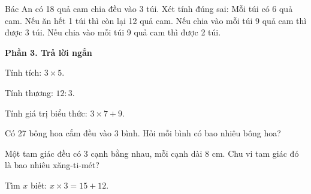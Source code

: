 \begin{ex} %
Bác An có 18 quả cam chia đều vào 3 túi. Xét tính đúng sai:
\choiceTF
{\True Mỗi túi có 6 quả cam.}
{\True Nếu ăn hết 1 túi thì còn lại 12 quả cam.}
{Nếu chia vào mỗi túi 9 quả cam thì được 3 túi.}
{\True Nếu chia vào mỗi túi 9 quả cam thì được 2 túi.}
\end{ex}

\textbf{Phần 3. Trả lời ngắn}

\begin{ex} %
Tính tích: $3 \times 5$.
\end{ex}

\begin{ex} %
Tính thương: $12 : 3$.
\end{ex}

\begin{ex} %
Tính giá trị biểu thức: $3 \times 7 + 9$.
\end{ex}

\begin{ex} %
Có 27 bông hoa cắm đều vào 3 bình. Hỏi mỗi bình có bao nhiêu bông hoa?
\end{ex}

\begin{ex} %
Một tam giác đều có 3 cạnh bằng nhau, mỗi cạnh dài $8\text{ cm}$. Chu vi tam giác đó là bao nhiêu xăng-ti-mét?
\end{ex}

\begin{ex} %
Tìm $x$ biết: $x \times 3 = 15 + 12$.
\end{ex}
